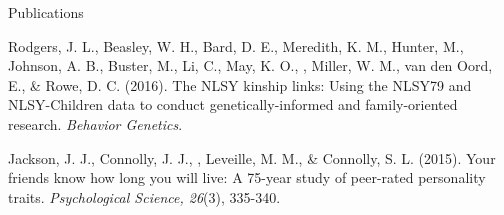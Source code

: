 \begin{rSection}{\textrm{Publications}}
\begin{etaremune}
\item Rodgers, J. L., Beasley, W. H., Bard, D. E., Meredith, K. M., Hunter, M., Johnson, A. B., Buster, M., Li, C., May, K. O., \meb, Miller, W. M., van den Oord, E., \& Rowe, D. C. (2016). The NLSY kinship links: Using the NLSY79 and NLSY-Children data to conduct genetically-informed and family-oriented research. \textit{Behavior Genetics}. \href{http://dx.doi.org/10.1007/s10519-016-9785-3}{\small\color{blue}{doi:\allowbreak 10.1007/s10519-016-9785-3}}
%
\item Jackson, J. J., Connolly, J. J., \meb, Leveille, M. M., \& Connolly, S. L. (2015). Your friends know how long you will live: A 75-year study of peer-rated personality traits. \textit{Psychological Science, 26}(3), 335-340.\\ \href{http://pss.sagepub.com/content/26/3/335}{\small\color{blue}{doi:\allowbreak 10.1177/0956797614561800}}
\end{etaremune}\end{rSection}%